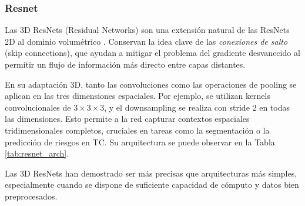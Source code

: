 \subsubsection{Resnet}
Las 3D ResNets (Residual Networks) son una extensión natural de las ResNets 2D al dominio volumétrico \parencite{hara2017learning}. Conservan la idea clave de las \textit{conexiones de salto} (skip connections), que ayudan a mitigar el problema del gradiente desvanecido al permitir un flujo de información más directo entre capas distantes.  

En su adaptación 3D, tanto las convoluciones como las operaciones de pooling se aplican en las tres dimensiones espaciales. Por ejemplo, se utilizan kernels convolucionales de $3 \times 3 \times 3$, y el downsampling se realiza con stride 2 en todas las dimensiones. Esto permite a la red capturar contextos espaciales tridimensionales completos, cruciales en tareas como la segmentación o la predicción de riesgos en TC. Su arquitectura se puede observar en la Tabla \ref{tab:resnet_arch}.

Las 3D ResNets han demostrado ser más precisas que arquitecturas más simples, especialmente cuando se dispone de suficiente capacidad de cómputo y datos bien preprocesados.


